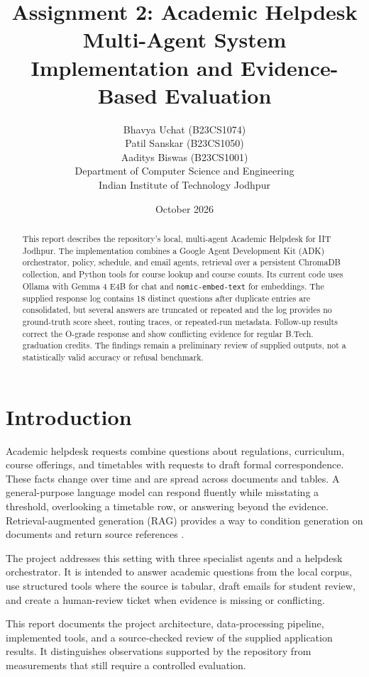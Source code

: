 \documentclass[11pt,a4paper]{article}
\title{\textbf{Assignment 2: Academic Helpdesk Multi-Agent System}\\[0.25em]
\large Implementation and Evidence-Based Evaluation}
\author{
  Bhavya Uchat (B23CS1074)\\
  Patil Sanskar (B23CS1050)\\
  Aaditys Biswas (B23CS1001)\\[0.6em]
  \normalsize Department of Computer Science and Engineering\\
  \normalsize Indian Institute of Technology Jodhpur
}
\date{October 2026}
\begin{document}
\maketitle

\begin{abstract}
This report describes the repository's local, multi-agent Academic Helpdesk for IIT Jodhpur. The implementation combines a Google Agent Development Kit (ADK) orchestrator, policy, schedule, and email agents, retrieval over a persistent ChromaDB collection, and Python tools for course lookup and course counts. Its current code uses Ollama with Gemma 4 E4B for chat and \texttt{nomic-embed-text} for embeddings. The supplied response log contains 18 distinct questions after duplicate entries are consolidated, but several answers are truncated or repeated and the log provides no ground-truth score sheet, routing traces, or repeated-run metadata. Follow-up results correct the O-grade response and show conflicting evidence for regular B.Tech. graduation credits. The findings remain a preliminary review of supplied outputs, not a statistically valid accuracy or refusal benchmark.
\end{abstract}

\section{Introduction}
Academic helpdesk requests combine questions about regulations, curriculum, course offerings, and timetables with requests to draft formal correspondence. These facts change over time and are spread across documents and tables. A general-purpose language model can respond fluently while misstating a threshold, overlooking a timetable row, or answering beyond the evidence. Retrieval-augmented generation (RAG) provides a way to condition generation on documents and return source references \cite{lewis2020rag}.

The project addresses this setting with three specialist agents and a helpdesk orchestrator. It is intended to answer academic questions from the local corpus, use structured tools where the source is tabular, draft emails for student review, and create a human-review ticket when evidence is missing or conflicting.

This report documents the project architecture, data-processing pipeline, implemented tools, and a source-checked review of the supplied application results. It distinguishes observations supported by the repository from measurements that still require a controlled evaluation.
\end{document}
